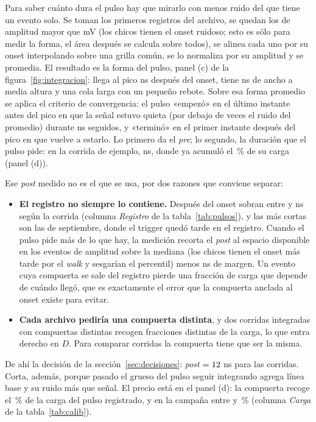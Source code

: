\documentclass[11pt,a4paper]{article}
\begin{document}
Para saber cuánto dura el pulso hay que mirarlo con menos ruido del que tiene
un evento solo. Se toman los primeros \NVentana{} registros del archivo, se
quedan los de amplitud mayor que \AmpMinimaForma{} mV (los chicos tienen el
onset ruidoso; esto es sólo para medir la forma, el área después se calcula
sobre todos), se alinea cada uno por su onset interpolando sobre una grilla
común, se lo normaliza por su amplitud y se promedia. El resultado es la forma
del pulso, panel (c) de la figura~\ref{fig:integracion}: llega al pico
\EjPico{} ns después del onset, tiene \EjFwhmPulso{} ns de ancho a media
altura y una cola larga con un pequeño rebote. Sobre esa forma promedio se aplica
el criterio de convergencia: el pulso «empezó» en el último instante antes del
pico en que la señal estuvo quieta (por debajo de \KConv{} veces el ruido del
promedio) durante \TramoConv{} ns seguidos, y «terminó» en el primer instante
después del pico en que vuelve a estarlo. Lo primero da el \emph{pre}; lo
segundo, la duración que el pulso pide: en la corrida de ejemplo,
\EjPostMedido{} ns, donde ya acumuló el \EjCargaPostMedido\,\% de su carga
(panel (d)).

Ese \emph{post} medido no es el que se usa, por dos razones que conviene
separar:

\begin{itemize}
\item \textbf{El registro no siempre lo contiene.} Después del onset
      sobran entre \RegistroMin{} y \RegistroMax{} ns según la corrida
      (columna \emph{Registro} de la tabla~\ref{tab:pulsos}), y las más
      cortas son las de septiembre, donde el trigger quedó tarde en el
      registro. Cuando el pulso
      pide más de lo que hay, la medición recorta el \emph{post} al espacio
      disponible en los eventos de amplitud sobre la mediana (los chicos tienen
      el onset más tarde por el \emph{walk} y sesgarían el percentil) menos
      \MargenRegistro{} ns de margen. Un evento cuya compuerta se sale del
      registro pierde una fracción de carga que depende de cuándo llegó, que
      es exactamente el error que la compuerta anclada al onset existe para
      evitar.
\item \textbf{Cada archivo pediría una compuerta distinta}, y dos corridas
      integradas con compuertas distintas recogen fracciones distintas de la
      carga, lo que entra derecho en $D$. Para comparar corridas la compuerta
      tiene que ser la misma.
\end{itemize}

De ahí la decisión de la sección~\ref{sec:decisiones}: \emph{post} $=
12$ ns para las \NCorridas{} corridas. Corta, además, porque pasado el
grueso del pulso seguir integrando agrega línea base y su ruido más que señal.
El precio está en el panel (d): la compuerta recoge el \EjCarga\,\% de la carga
del pulso registrado, y en la campaña entre \CargaMin{} y \CargaMax\,\%
(columna \emph{Carga} de la tabla~\ref{tab:calib}).
\end{document}
